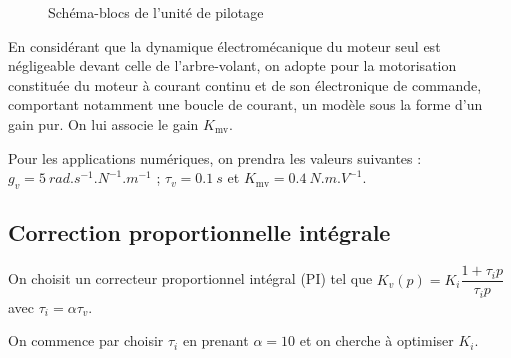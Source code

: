 \begin{multicols}{2}
\begin{figure}[H]
\caption{Schéma-blocs de l'unité de pilotage  \label{fig_11}}
\end{figure}

En considérant que la dynamique électromécanique du moteur seul est négligeable devant celle de
l'arbre-volant, on adopte pour la motorisation constituée du moteur à courant continu et de son
électronique de commande, comportant notamment une boucle de courant, un modèle sous la forme
d'un gain pur. On lui associe le gain $K_{\text{mv}}$.

Pour les applications numériques, on prendra les valeurs suivantes :
$g_v=\SI{5}{rad.s^{-1}.N^{-1}.m^{-1}}$ ; $\tau_v = \SI{0,1}{s}$ et $K_{\text{mv}} = \SI{0,4}{N.m.V^{-1}}$.

\subsection*{Correction proportionnelle intégrale}

On choisit un correcteur proportionnel intégral (PI) tel que $K_v(p)=K_i \dfrac{1+\tau_i p}{\tau_i p}$
avec $\tau_i =\alpha \tau_v$.



\ifprof
\begin{corrige}
\end{corrige}
\else
\fi


\ifprof
\begin{corrige}
\end{corrige}
\else
\fi

On commence par choisir $\tau_i$ en prenant $\alpha=10$ et on cherche à optimiser $K_i$.


\end{multicols}
